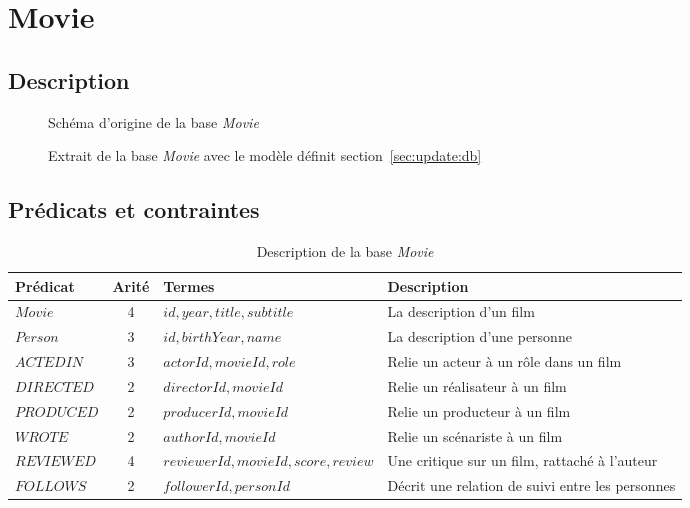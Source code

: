 \minitoc

\section{Movie}

\subsection{Description}

\begin{figure}[H]
    \caption{Schéma d'origine de la base \textit{Movie}}
\end{figure}

\begin{figure}[H]
    \caption{Extrait de la base \textit{Movie} avec le modèle définit section~\ref{sec:update:db}}
\end{figure}

\subsection{Prédicats et contraintes}

\begin{table}[H]
    \centering
    \begin{adjustbox}{width=\linewidth}
        \begin{tabular}{l|c|l|l}
            Prédicat & Arité & Termes & Description \\
            \hline
            \hline
            $Movie$ & 4 & $id, year, title, subtitle$ & La description d'un film \\
            $Person$ & 3 & $id, birthYear, name$ & La description d'une personne \\
            $ACTEDIN$ & 3 & $actorId, movieId, role$ & Relie un acteur à un rôle dans un film \\
            $DIRECTED$ & 2 & $directorId, movieId$ & Relie un réalisateur à un film \\
            $PRODUCED$ & 2 & $producerId, movieId$ & Relie un producteur à un film \\
            $WROTE$ & 2 & $authorId, movieId$ & Relie un scénariste à un film \\
            $REVIEWED$ & 4 & $reviewerId, movieId, score, review$ & Une critique sur un film, rattaché à l'auteur \\
            $FOLLOWS$ & 2 & $followerId, personId$ & Décrit une relation de suivi entre les personnes \\
        \end{tabular}
    \end{adjustbox}
    \caption{Description de la base \textit{Movie}}
\end{table}

